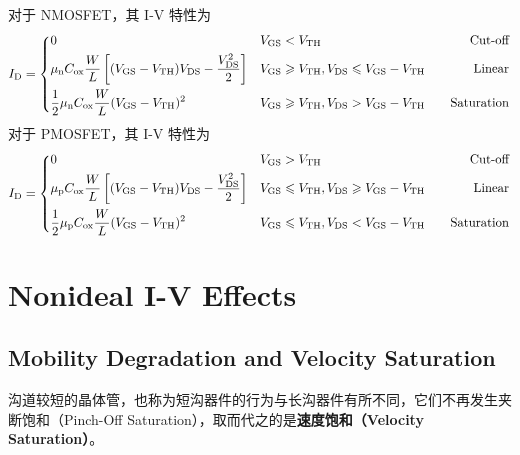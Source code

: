 对于 NMOSFET，其 I-V 特性为
\begin{equation}
    I_{\rm{D}} = 
    \begin{dcases}  %
        \begin{aligned}
            & 0 && V_{\rm{GS}} < V_{\rm{TH}} &&& \text{Cut-off} \\
            & \mu_{\rm{n}} C_{\rm{ox}} \frac{W}{L} \left[ (V_{\rm{GS}} - V_{\rm{TH}}) V_{\rm{DS}} - \frac{V_{\rm{DS}}^2}{2} \right] && V_{\rm{GS}} \geqslant V_{\rm{TH}}, V_{\rm{DS}} \leqslant V_{\rm{GS}} - V_{\rm{TH}} &&& \text{Linear} \\
            & \frac{1}{2} \mu_{\rm{n}} C_{\rm{ox}} \frac{W}{L} (V_{\rm{GS}} - V_{\rm{TH}})^2 && V_{\rm{GS}} \geqslant V_{\rm{TH}}, V_{\rm{DS}} > V_{\rm{GS}} - V_{\rm{TH}} &&& \text{Saturation}
        \end{aligned}
    \end{dcases}
\end{equation}
对于 PMOSFET，其 I-V 特性为
\begin{equation}
    I_{\rm{D}} = 
    \begin{dcases}  %
        \begin{aligned}
            & 0 && V_{\rm{GS}} > V_{\rm{TH}} &&& \text{Cut-off} \\
            & \mu_{\rm{p}} C_{\rm{ox}} \frac{W}{L} \left[ (V_{\rm{GS}} - V_{\rm{TH}}) V_{\rm{DS}} - \frac{V_{\rm{DS}}^2}{2} \right] && V_{\rm{GS}} \leqslant V_{\rm{TH}}, V_{\rm{DS}} \geqslant V_{\rm{GS}} - V_{\rm{TH}} &&& \text{Linear} \\
            & \frac{1}{2} \mu_{\rm{p}} C_{\rm{ox}} \frac{W}{L} (V_{\rm{GS}} - V_{\rm{TH}})^2 && V_{\rm{GS}} \leqslant V_{\rm{TH}}, V_{\rm{DS}} < V_{\rm{GS}} - V_{\rm{TH}} &&& \text{Saturation}
        \end{aligned}
    \end{dcases}
\end{equation}

\section{Nonideal I-V Effects}

\subsection{Mobility Degradation and Velocity Saturation}

沟道较短的晶体管，也称为短沟器件的行为与长沟器件有所不同，它们不再发生夹断饱和（Pinch-Off Saturation），取而代之的是\textbf{速度饱和（Velocity Saturation）}。


